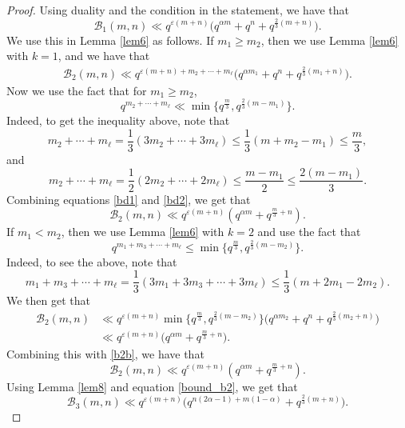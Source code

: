 \documentclass[12pt]{amsart}
\begin{document}
\begin{proof}
Using duality and the condition in the statement, we have that
$$ \mathcal{B}_1(m,n) \ll q^{\varepsilon(m+n)} \Big( q^{\alpha m} + q^{n} + q^{\frac{2}{3}(m+n)} \Big).$$
We use this in Lemma \ref{lem6} as follows. If $m_1 \geq m_2$, then we use Lemma \ref{lem6} with $k=1$, and we have that
\begin{align} 
\label{bd1}
\mathcal{B}_2(m,n) \ll q^{\varepsilon(m+n)+m_2+\cdots+m_{\ell}} \Big(q^{\alpha m_1} + q^n + q^{\frac{2}{3}(m_1+n)} \Big).
\end{align}
Now we use the fact that for $m_1 \geq m_2$, 
\begin{equation} q^{m_2+\cdots+m_{\ell}} \ll \min \{ q^{\frac{m}{3}} , q^{\frac{2}{3}(m-m_1)} \}.
\label{bd2}
\end{equation}
Indeed, to get the inequality above, note that
$$ m_2+\cdots + m_{\ell} = \frac{1}{3} (3m_2+\cdots + 3m_{\ell}) \leq \frac{1}{3} (m + m_2-m_1) \leq \frac{m}{3},$$
and
$$ m_2+\cdots+m_{\ell} = \frac{1}{2} (2m_2+\cdots +2m_{\ell}) \leq \frac{m-m_1}{2} \leq \frac{2(m-m_1)}{3}.$$
Combining equations \eqref{bd1} and \eqref{bd2}, we get that 
\begin{equation}
\label{b2b}
\mathcal{B}_2(m,n) \ll q^{\varepsilon(m+n)} (q^{\alpha m}+ q^{\frac{m}{3}+ n}).
\end{equation}
If $m_1 < m_2$, then we use Lemma \ref{lem6} with $k=2$ and use the fact that
\begin{equation}
\label{fact2}
q^{m_1+m_3+\cdots+m_{\ell}} \leq \min \{ q^{\frac{m}{3}}, q^{\frac{2}{3}(m-m_2)} \}.
\end{equation}
Indeed, to see the above, note that 
$$ m_1+ m_3+\cdots+m_{\ell} = \frac{1}{3} (3m_1+3m_3+\cdots+3m_{\ell}) \leq \frac{1}{3} (m+2m_1-2m_2).$$
We then get that
\begin{align*}
\mathcal{B}_2(m,n) &\ll q^{\varepsilon(m+n)} \min \{ q^{\frac{m}{3}}, q^{\frac{2}{3}(m-m_2)} \} \Big(q^{\alpha m_2} + q^n + q^{\frac{2}{3}(m_2+n)} \Big) \\
& \ll q^{\varepsilon(m+n)} \Big( q^{\alpha m} + q^{\frac{m}{3}+n}\Big).
\end{align*}
Combining this with \eqref{b2b}, we have that
\begin{equation}
\mathcal{B}_2(m,n) \ll q^{\varepsilon(m+n)} (q^{\alpha m}+ q^{\frac{m}{3}+ n}).
\label{bound_b2}
\end{equation}
Using Lemma \ref{lem8} and equation \eqref{bound_b2}, we get that
\begin{equation*}
\mathcal{B}_3(m,n) \ll q^{\varepsilon(m+n)} \Big(q^{n(2\alpha-1)+m(1-\alpha)} + q^{\frac{2}{3}(m+n)} \Big).

\end{equation*}
\end{proof}
\end{document}
